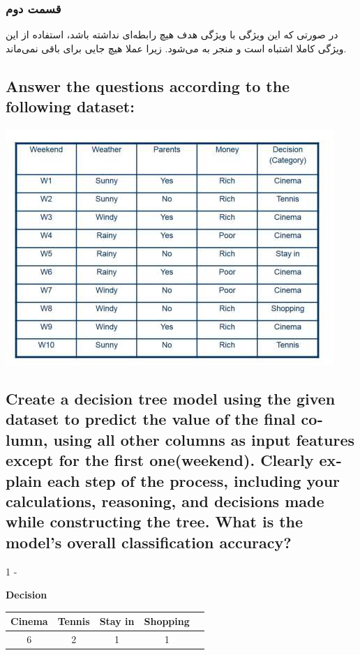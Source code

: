 \documentclass{article}
\begin{document}
		\subsubsection*{قسمت دوم}
		در صورتی که این ویژگی با ویژگی هدف هیچ رابطه‌ای نداشته باشد، استفاده از این ویژگی کاملا اشتباه است و منجر به 
		می‌شود. زیرا عملا هیچ جایی برای 
		باقی نمی‌ماند.
	\begin{latin}
		\section{Answer the questions according to the following dataset:}
		\begin{center}
			\includegraphics{figs/Dataset_image.png}
		\end{center}
		
		\subsection{Create a decision tree model using the given dataset to predict the value
			of the final column, using all other columns as input features except for
			the first one(weekend). Clearly explain each step of the process, including
			your calculations, reasoning, and decisions made while constructing the
			tree. What is the model's overall classification accuracy?}
	\end{latin}
	1 - 
	\begin{latin}
		\textbf{Decision}
		\begin{center}
			\begin{tabular}{|c|c|c|c|c|}
				\hline
				Cinema & Tennis & Stay in & Shopping\\
				\hline
				\hline
				 6 & 2 & 1 & 1\\
				\hline
			\end{tabular}
		\end{center}
	\end{latin}
\end{document}
